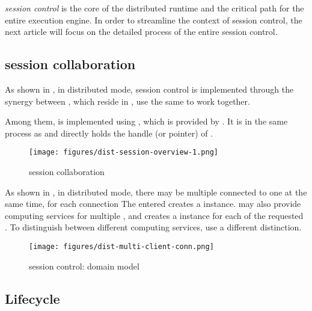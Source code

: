 \begin{content}

\emph{session control} is the core of the \tf{} distributed runtime and the critical path for the entire \tf{} execution engine. In order to streamline the context of session control, the next article will focus on the detailed process of the entire session control.


\subsection{session collaboration}

As shown in , in distributed mode, session control is implemented through the synergy between , which reside in , use the same  to work together.

Among them,  is implemented using , which is  provided by \tf{}. It is in the same process as  and directly holds the handle (or pointer) of .

\begin{figure}[H]
\centering
\texttt{[image: figures/dist-session-overview-1.png]}
\caption{session collaboration}
 \label{fig:dist-session-overview}
\end{figure}

As shown in , in distributed mode, there may be multiple  connected to one  at the same time,  for each connection The  entered creates a  instance.  may also provide computing services for multiple , and  creates a  instance for each of the requested . To distinguish between different  computing services, use a different  distinction.

\begin{figure}[H]
\centering
\texttt{[image: figures/dist-multi-client-conn.png]}
\caption{session control: domain model}
 \label{fig:dist-multi-client-conn}
\end{figure}

\subsection{Lifecycle}


\end{content}
